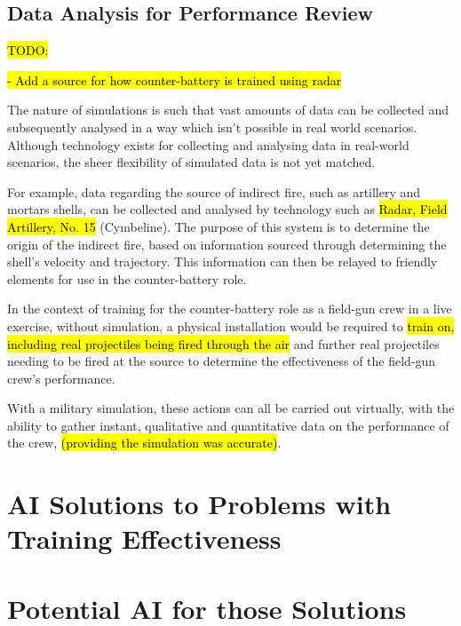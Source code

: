\documentclass{article}
\begin{document}


\subsection{Data Analysis for Performance Review}

\hl{TODO:} 

\hl{- Add a source for how counter-battery is trained using radar}

The nature of simulations is such that vast amounts of data can be collected and subsequently analysed in a way which isn't possible in real world scenarios. Although technology exists for collecting and analysing data in real-world scenarios, the sheer flexibility of simulated data is not yet matched.

For example, data regarding the source of indirect fire, such as artillery and mortars shells, can be collected and analysed by technology such as \hl{Radar, Field Artillery, No. 15} (Cymbeline). The purpose of this system is to determine the origin of the indirect fire, based on information sourced through determining the shell's velocity and trajectory. This information can then be relayed to friendly elements for use in the counter-battery role.

In the context of training for the counter-battery role as a field-gun crew in a live exercise, without simulation, a physical installation would be required to \hl{train on, including real projectiles being fired through the air} and further real projectiles needing to be fired at the source to determine the effectiveness of the field-gun crew's performance.

With a military simulation, these actions can all be carried out virtually, with the ability to gather instant, qualitative and quantitative data on the performance of the crew, \hl{(providing the simulation was accurate)}.

\section{AI Solutions to Problems with Training Effectiveness}

\section{Potential AI for those Solutions}
\end{document}
